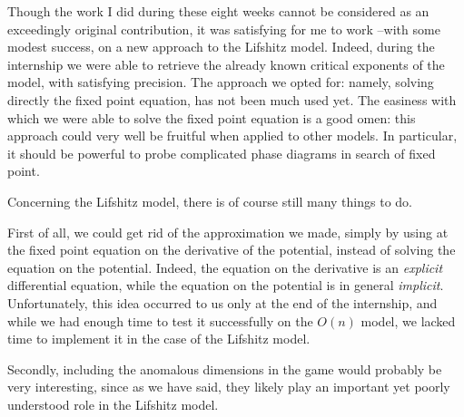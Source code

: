 Though the work I did during these eight weeks cannot be considered as an exceedingly original contribution, it was satisfying for me to work --with some modest success, on a new approach to the Lifshitz model. 
Indeed, during the internship we were able to retrieve the already known critical exponents of the model, with satisfying precision. The approach we opted for: namely, solving directly the fixed point equation, has not been much used yet. The easiness with which we were able to solve the fixed point equation is a good omen: this approach could very well be fruitful when applied to other models. In particular, it should be powerful to probe complicated phase diagrams in search of fixed point.


Concerning the Lifshitz model, there is of course still many things to do. 

First of all, we could get rid of the approximation we made, simply by using at the fixed point equation on the derivative of the potential, instead of solving the equation on the potential. Indeed, the equation on the derivative is an \textit{explicit} differential equation, while the equation on the potential is in general \textit{implicit}. Unfortunately, this idea occurred to us only at the end of the internship, and while we had enough time to test it successfully on the $O(n)$ model,  we lacked time to implement it in the case of the Lifshitz model.

Secondly, including the anomalous dimensions in the game would probably be very interesting, since as we have said, they likely play an important yet poorly understood role in the Lifshitz model.
